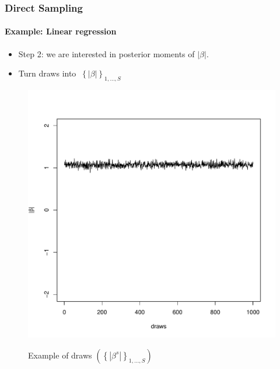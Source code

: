 \documentclass[
  shownotes,
  xcolor={svgnames},
  hyperref={colorlinks,citecolor=DarkBlue,linkcolor=DarkRed,urlcolor=DarkBlue}
  , aspectratio=169]{beamer}
\begin{document}
\begin{frame}[fragile]
\frametitle{Direct Sampling}
\framesubtitle{Example: Linear regression}
\begin{itemize}

\item Step 2: we are interested in posterior moments of $|\beta|$. 
\item Turn draws into $\ \left\{ \left| \beta \right| \right\}_{1,\ldots,S}$
\end{itemize}

\begin{figure}[H] \centering
  \centering
  \caption{Example of draws $\left( \left\{ |\beta^{s}| \right\}_{1,\ldots,S} \right)$}
  \includegraphics[scale=0.25]{figures/abs}
  \\
  \tiny 
\end{figure}




\end{frame}
\end{document}
